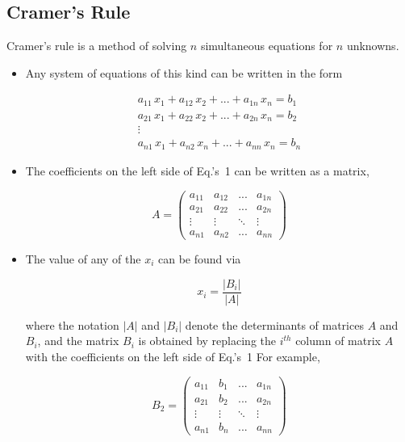 \documentclass[12pt]{article}
\begin{document}
\begin{latexonly}
\subsection*{Cramer's Rule}
\end{latexonly}

Cramer's rule is a method of solving $n$ simultaneous equations
for $n$ unknowns. 

\begin{itemize}
\item Any system of equations of this kind can be written
in the form 

\begin{equation}
\begin{array}{c}
a_{11} \, x_1 + a_{12} \, x_2 + ... + a_{1n} \, x_n = b_{1} \\
a_{21} \, x_1 + a_{22} \, x_2 + ... + a_{2n} \, x_n = b_{2} \\
\vdots \\
a_{n1} \, x_1 + a_{n2} \, x_n + ... + a_{nn} \, x_n = b_{n} 
\end{array}
\label{eq:neq}
\end{equation}

\item The coefficients on the left side of Eq.'s~1 %
  can be written as a matrix, 

\begin{equation}
A = 
\left(
\begin{array}{cccc}
a_{11}  & a_{12} & ...    & a_{1n} \\
a_{21}  & a_{22} & ...    & a_{2n} \\
\vdots  &\vdots  & \ddots & \vdots \\
a_{n1}  & a_{n2} & ...    & a_{nn}
\end{array}
\right)
\end{equation}

\item The value of any of the $x_i$ can be found via

\begin{equation}
x_i = \frac{|B_i|}{|A|}
\label{eq:sols}
\end{equation}

\noindent
where the notation $|A|$ and $|B_i|$ denote the 
determinants of matrices $A$ and $B_i$, and the matrix $B_i$ is
obtained by replacing the $i^{th}$ column of matrix $A$ with the
coefficients on the left side of Eq.'s~1 %
For example,

\begin{equation}
B_2 = 
\left(
\begin{array}{cccc}
a_{11} & b_1    & ...    & a_{1n} \\
a_{21} & b_2    & ...    & a_{2n} \\
\vdots & \vdots & \ddots & \vdots \\
a_{n1} & b_n    & ...    & a_{nn}
\end{array}
\right)
\end{equation}

\end{itemize}
\end{document}
